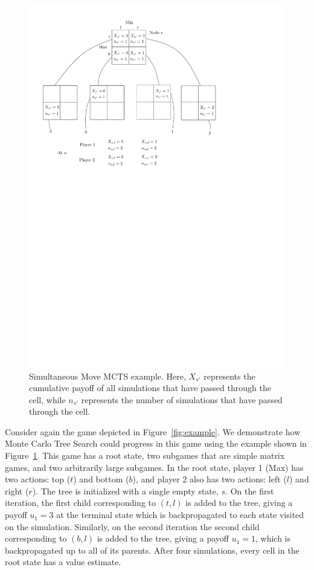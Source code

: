\begin{figure}[t]
\centering
\includegraphics[scale=0.7]{figures/smmcts-example}
\caption{Simultaneous Move MCTS example.
Here, $X_{s'}$ represents the cumulative payoff of all simulations that have passed
through the cell, while $n_{s'}$ represents the number of simulations that have passed through the cell.}
\label{fig:smmcts-example}
\end{figure}

Consider again the game depicted in Figure~\ref{fig:example}. We demonstrate how Monte Carlo Tree Search
could progress in this game using the example shown in Figure~\ref{fig:smmcts-example}. This game has a root state,
two subgames that are simple matrix games, and two arbitrarily large subgames. In the root state, player 1 (Max) has two
actions: top ($t$) and bottom ($b$), and player 2 also has two actions: left ($l$) and right ($r$). The tree is initialized
with a single empty state, $s$. On the first iteration, the first child corresponding to $(t,l)$ is added to the tree,
giving a payoff $u_1 = 3$ at the terminal state which is backpropagated to each state visited on the simulation.
Similarly, on the second iteration the second child corresponding to $(b,l)$ is added to the tree, giving a payoff $u_1 = 1$, which is
backpropagated up to all of its parents.
After four simulations, every cell in the root state has a value estimate.

